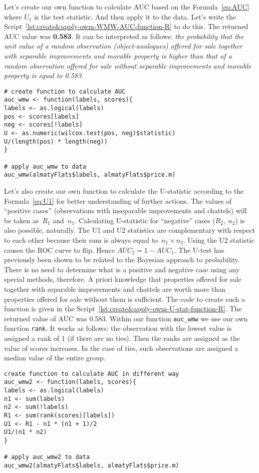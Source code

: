 \documentclass[]{scrreprt}
\begin{document}
Let's create our own function to calculate AUC based on the Formula~\ref{eq:AUC} where $U_{1}$ is the test statistic. And then apply it to the data. Let's write the Script~\ref{lst:create&apply-owm-WMW-AUC-function-R} to do this. The returned AUC value was \textbf{0.583}. It can be interpreted as follows: \emph{the probability that the unit value of a random observation (object-analogues) offered for sale together with separable improvements and movable property is higher than that of a random observation offered for sale without separable improvements and movable property is equal to 0.583}.
%
\begin{lstlisting}[float=htp, caption = Create your own function to calculate the AUC and apply it to the data of the Almaty market., firstnumber=1, label= lst:create&apply-owm-WMW-AUC-function-R]
# create function to calculate AUC
auc_wmw <- function(labels, scores){
labels <- as.logical(labels)
pos <- scores[labels]
neg <- scores[!labels]
U <- as.numeric(wilcox.test(pos, neg)$statistic)
U/(length(pos) * length(neg))
}

# apply auc_wmw to data
auc_wmw(almatyFlats$labels, almatyFlats$price.m)
\end{lstlisting}
%

Let's also create our own function to calculate the U-statistic according to the Formula~\ref{eq:U1} for better understanding of further actions. The values of ``positive cases'' (observations with inseparable improvements and chattels) will be taken as~$R_{1}$ and~$n_{1}$. Calculating U-statistic for ``negative'' cases ($R_{2},\ n_{2}$) is also possible, naturally. The U1 and U2 statistics are complementary with respect to each other because their sum is always equal to~$n_{1} \times n_{2}$. Using the U2 statistic causes the ROC curve to flip. Hence $AUC_{2}=1-AUC_{1}$. The U-test has previously been shown to be related to the Bayesian approach to probability. There is no need to determine what is a positive and negative case using any special methods, therefore. A priori knowledge that properties offered for sale together with separable improvements and chattels are worth more than properties offered for sale without them is sufficient. The code to create such a function is given in the Script~\ref{lst:create&apply-owm-U-stat-function-R}. The returned value of AUC was 0.583. Within our function \texttt{auc\_wmw} we use our own function \texttt{rank}. It works as follows: the observation with the lowest value is assigned a rank of 1 (if there are no ties). Then the ranks are assigned as the value of scores increases. In the case of ties, such observations are assigned a median value of the entire group.
%
\begin{lstlisting}[float=htp, caption = Creation of own function to calculate U-statistic and its application to Almaty market data, firstnumber=1, label= lst:create&apply-owm-U-stat-function-R]
create function to calculate AUC in different way
auc_wmw2 <- function(labels, scores){
labels <- as.logical(labels)
n1 <- sum(labels)
n2 <- sum(!labels)
R1 <- sum(rank(scores)[labels])
U1 <- R1 - n1 * (n1 + 1)/2
U1/(n1 * n2)
}

# apply auc_wmw2 to data
auc_wmw2(almatyFlats$labels, almatyFlats$price.m)
\end{lstlisting}
%
\end{document}
